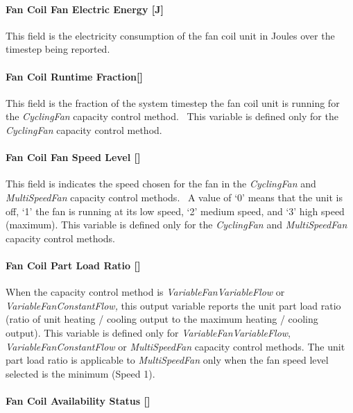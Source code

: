 \paragraph{Fan Coil Fan Electric Energy {[}J{]}}\label{fan-coil-fan-electric-energy-j}

This field is the electricity consumption of the fan coil unit in Joules over the timestep being reported.

\paragraph{Fan Coil Runtime Fraction{[]}}\label{fan-coil-runtime-fraction}

This field is the fraction of the system timestep the fan coil unit is running for the \emph{CyclingFan} capacity control method.~ This variable is defined only for the \emph{CyclingFan} capacity control method.

\paragraph{Fan Coil Fan Speed Level {[]}}\label{fan-coil-fan-speed-level}

This field is indicates the speed chosen for the fan in the \emph{CyclingFan} and \emph{MultiSpeedFan} capacity control methods.~ A value of `0' means that the unit is off, `1' the fan is running at its low speed, `2' medium speed, and `3' high speed (maximum). This variable is defined only for the \emph{CyclingFan} and \emph{MultiSpeedFan} capacity control methods.

\paragraph{Fan Coil Part Load Ratio {[]}}\label{fan-coil-part-load-ratio}

When the capacity control method is \emph{VariableFanVariableFlow} or \emph{VariableFanConstantFlow,} this output variable reports the unit part load ratio (ratio of unit heating / cooling output to the maximum heating / cooling output). This variable is defined only for \emph{VariableFanVariableFlow}, \emph{VariableFanConstantFlow} or \emph{MultiSpeedFan} capacity control methods. The unit part load ratio is applicable to \emph{MultiSpeedFan} only when the fan speed level selected is the minimum (Speed 1).

\paragraph{Fan Coil Availability Status {[]}}\label{fan-coil-availability-status}

